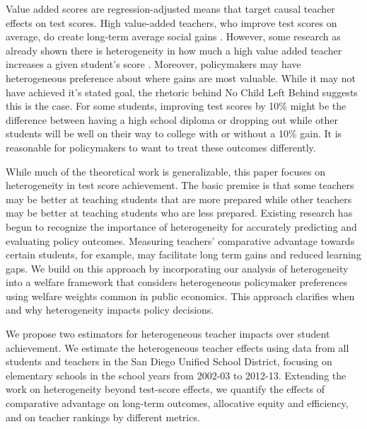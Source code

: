 \documentclass[12pt]{article}
\theoremstyle{definition}
\theoremstyle{definition}
\theoremstyle{definition}
\theoremstyle{definition}
\begin{document}
    Value added scores are regression-adjusted means that target causal teacher effects on test scores.  High value-added teachers, who improve test scores on average, do create long-term average social gains \citep[e.g.,][]{chetty2014measuring2,pope2017multidimensional}. However, some research as already shown there is heterogeneity in how much a high value added teacher increases a given student's score \citep[as in][etc.]{Delgado2020,bates2022teacher}. Moreover, policymakers may have heterogeneous preference about where gains are most valuable. While it may not have achieved it's stated goal, the rhetoric behind No Child Left Behind suggests this is the case. For some students, improving test scores by 10\% might be the difference between having a high school diploma or dropping out while other students will be well on their way to college with or without a 10\% gain. It is reasonable for policymakers to want to treat these outcomes differently. 

    While much of the theoretical work is generalizable, this paper focuses on heterogeneity in test score achievement. The basic premise is that some teachers may be better at teaching students that are more prepared while other teachers may be better at teaching students who are less prepared. Existing research has begun to recognize the importance of heterogeneity for accurately predicting and evaluating policy outcomes.  Measuring teachers' comparative advantage towards certain students, for example, may facilitate long term gains and reduced learning gaps. We build on this approach by incorporating our analysis of heterogeneity into a welfare framework that considers heterogeneous policymaker preferences using welfare weights common in public economics. This approach clarifies when and why heterogeneity impacts policy decisions.
    
    We propose two estimators for heterogeneous teacher impacts over student achievement. We estimate the heterogeneous teacher effects using data from all students and teachers in the San Diego Unified School District, focusing on elementary schools in the school years from 2002-03 to 2012-13. Extending the work on heterogeneity beyond test-score effects, we quantify the effects of comparative advantage on long-term outcomes, allocative equity and efficiency, and on teacher rankings by different metrics.
    
\end{document}
